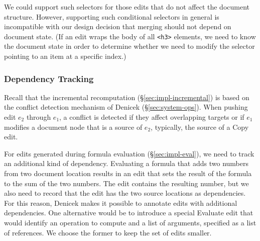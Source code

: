 \documentclass[sigconf,anonymous,screen]{acmart}
\newcommand{\ident}[1]{{\sffamily #1}}
\begin{document}
We could support such selectors for those edits that do not affect the document
structure. However, supporting such conditional selectors in general is incompatible with our
design decision that merging should not depend on document state. (If an edit wraps the body of all
{\small\Verb_<h3>_} elements, we need to know the document state in order to determine whether
we need to modify the selector pointing to an item at a specific index.)

\subsubsection*{Dependency Tracking}
Recall that the incremental recomputation (\S\ref{sec:impl-incremental}) is based on the
conflict detection mechanism of Denicek (\S\ref{sec:system-ops}). When pushing edit $e_2$ through
$e_1$, a conflict is detected if they affect overlapping targets or if $e_1$ modifies a
document node that is a source of $e_2$, typically, the source of a \ident{Copy} edit.

For edits generated during formula evaluation (\S\ref{sec:impl-eval}), we need to track an
additional kind of dependency. Evaluating a formula that adds two numbers from two document
location results in an edit that sets the result of the formula to the sum of the two numbers.
The edit contains the resulting number, but we also need to record that the edit has the two
source locations as dependencies. For this reason, Denicek makes it possible to annotate edits
with additional dependencies. One alternative would be to introduce a special \ident{Evaluate}
edit that would identify an operation to compute and a list of arguments, specified as a list
of references. We choose the former to keep the set of edits smaller.


\end{document}
